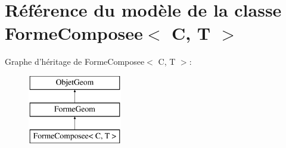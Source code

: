 \hypertarget{class_forme_composee}{\section{Référence du modèle de la classe Forme\+Composee$<$ C, T $>$}
\label{class_forme_composee}
}
Graphe d'héritage de Forme\+Composee$<$ C, T $>$\+:\begin{figure}[H]
\begin{center}
\leavevmode
\includegraphics[height=3.000000cm]{class_forme_composee}
\end{center}
\end{figure}
